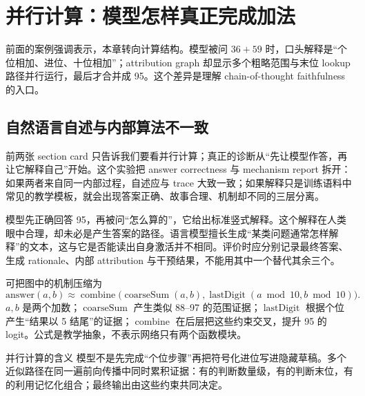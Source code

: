 \section{并行计算：模型怎样真正完成加法}

前面的案例强调表示，本章转向计算结构。模型被问 $36+59$ 时，口头解释是“个位相加、进位、十位相加”；attribution graph 却显示多个粗略范围与末位 lookup 路径并行运行，最后才合并成 95。这个差异是理解 chain-of-thought faithfulness 的入口。



\subsection{自然语言自述与内部算法不一致}

前两张 section card 只告诉我们要看并行计算；真正的诊断从“先让模型作答，再让它解释自己”开始。这个实验把 answer correctness 与 mechanism report 拆开：如果两者来自同一内部过程，自述应与 trace 大致一致；如果解释只是训练语料中常见的教学模板，就会出现答案正确、故事合理、机制却不同的三层分离。

模型先正确回答 95，再被问“怎么算的”，它给出标准竖式解释。这个解释在人类眼中合理，却未必是产生答案的路径。语言模型擅长生成“某类问题通常怎样解释”的文本，这与它是否能读出自身激活并不相同。评价时应分别记录最终答案、生成 rationale、内部 attribution 与干预结果，不能用其中一个替代其余三个。



可把图中的机制压缩为
\[
\text{answer}(a,b)\approx
\operatorname{combine}\bigl(
\operatorname{coarseSum}(a,b),
\operatorname{lastDigit}(a\bmod 10,b\bmod 10)
\bigr).
\]
$a,b$ 是两个加数；$\operatorname{coarseSum}$ 产生类似 88--97 的范围证据；$\operatorname{lastDigit}$ 根据个位产生“结果以 5 结尾”的证据；$\operatorname{combine}$ 在后层把这些约束交叉，提升 95 的 logit。公式是教学抽象，不表示网络只有两个函数模块。

\begin{importantbox}{并行计算的含义}
模型不是先完成“个位步骤”再把符号化进位写进隐藏草稿。多个近似路径在同一遍前向传播中同时累积证据：有的判断数量级，有的判断末位，有的利用记忆化组合；最终输出由这些约束共同决定。
\end{importantbox}

